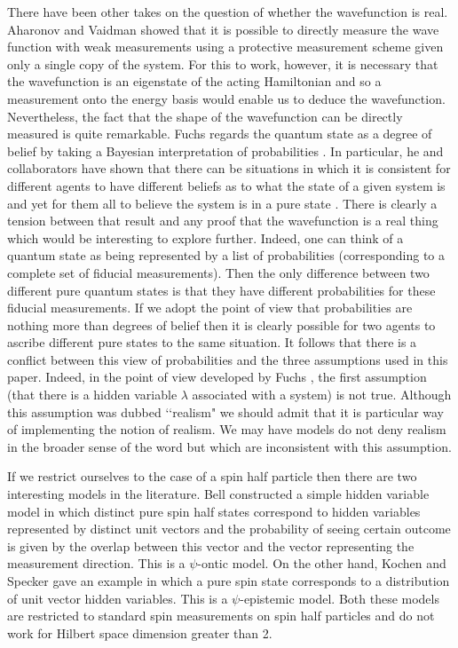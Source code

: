 \documentclass[12pt]{article}
\begin{document}
There have been other takes on the question of whether the wavefunction is real.   Aharonov and Vaidman \cite{aharonov1993measurement} showed that it is possible to directly measure the wave
function with weak measurements using a protective measurement scheme given only a single copy of the system.  For this to work, however, it is necessary that the wavefunction is an
eigenstate of the acting Hamiltonian and so a measurement onto the energy basis would enable us to deduce the wavefunction. Nevertheless, the fact that the shape of the wavefunction can be
directly measured is quite remarkable.  Fuchs regards the quantum state as a degree of belief by taking a Bayesian interpretation of probabilities \cite{fuchs2010qbism}.  In particular, he
and collaborators have shown that there can be situations in which it is consistent for different agents to have different beliefs as to what the state of a given system is and yet for them
all to believe the system is in a pure state \cite{caves2002conditions}.  There is clearly a tension between that result and any proof that the wavefunction is a real thing which would be
interesting to explore further.  Indeed, one can think of a quantum state as being represented by a list of probabilities (corresponding to a complete set of fiducial measurements).  Then the only difference between two different pure quantum states is that they have different probabilities for these fiducial measurements.  If we adopt the point of view that probabilities are nothing more than degrees of belief then it is clearly possible for two agents to ascribe different pure states to the same situation.  It follows that there is a conflict between this view of probabilities and the three assumptions used in this paper.  Indeed, in the point of view developed by Fuchs \cite{fuchs2010qbism}, the first assumption (that there is a hidden variable $\lambda$ associated with a system) is not true.   Although this assumption was dubbed \lq\lq realism" we should admit that it is particular way of implementing the notion of realism.  We may have models do not deny realism in the broader sense of the word but which are inconsistent with this assumption.

If we restrict ourselves to the case of a spin half particle then there are two interesting models in the literature. Bell \cite{bell1964on} constructed a simple hidden variable model in
which distinct pure spin half states correspond to hidden variables represented by distinct unit vectors and the probability of seeing certain outcome is given by the overlap between this
vector and the vector representing the measurement direction.  This is a $\psi$-ontic model.  On the other hand, Kochen and Specker \cite{kochen1967problem} gave an example in which a pure
spin state corresponds to a distribution of unit vector hidden variables. This is a $\psi$-epistemic model.  Both these models are restricted to standard spin measurements on spin half
particles and do not work for Hilbert space dimension greater than 2.
\end{document}
